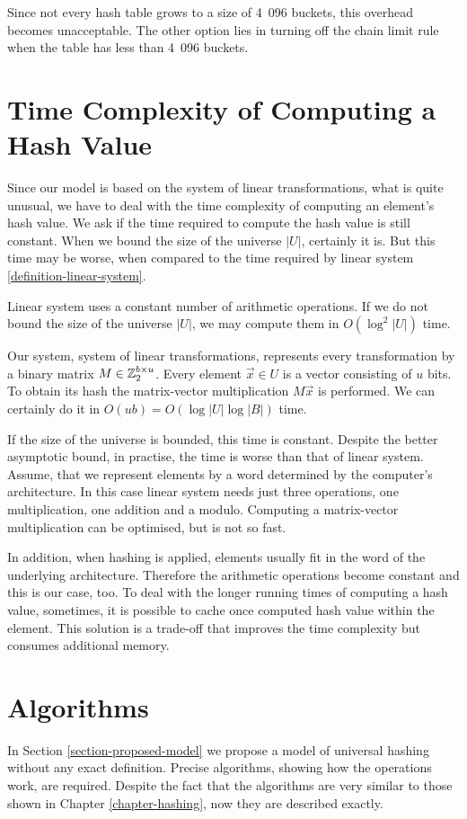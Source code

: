 Since not every hash table grows to a size of 4~096 buckets, this overhead becomes unacceptable. The other option lies in turning off the chain limit rule when the table has less than 4~096 buckets.

\section{Time Complexity of Computing a Hash Value}
\label{section-time-complexity}
Since our model is based on the system of linear transformations, what is quite unusual, we have to deal with the time complexity of computing an element's hash value. We ask if the time required to compute the hash value is still constant. When we bound the size of the universe $|U|$, certainly it is. But this time may be worse, when compared to the time required by linear system \ref{definition-linear-system}. 

Linear system uses a constant number of arithmetic operations. If we do not bound the size of the universe $|U|$, we may compute them in $O(\log^2 |U|)$ time. 

Our system, system of linear transformations, represents every transformation by a binary matrix $M \in \mathbb{Z}_{2}^{b \times u}$. Every element $\vec{x} \in U$ is a vector consisting of $u$ bits. To obtain its hash the matrix-vector multiplication $M\vec{x}$ is performed. We can certainly do it in $O(u b) = O(\log |U| \log |B|)$ time. 

If the size of the universe is bounded, this time is constant. Despite the better asymptotic bound, in practise, the time is worse than that of linear system. Assume, that we represent elements by a word determined by the computer's architecture. In this case linear system needs just three operations, one multiplication, one addition and a modulo. Computing a matrix-vector multiplication can be optimised, but is not so fast. 

In addition, when hashing is applied, elements usually fit in the word of the underlying architecture. Therefore the arithmetic operations become constant and this is our case, too. To deal with the longer running times of computing a hash value, sometimes, it is possible to cache once computed hash value within the element. This solution is a trade-off that improves the time complexity but consumes additional memory.

\section{Algorithms}
In Section \ref{section-proposed-model} we propose a model of universal hashing without any exact definition. Precise algorithms, showing how the operations work, are required. Despite the fact that the algorithms are very similar to those shown in Chapter \ref{chapter-hashing}, now they are described exactly.

